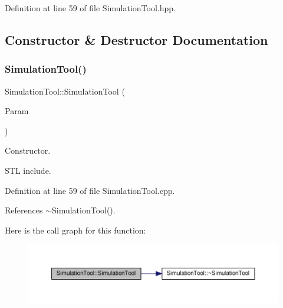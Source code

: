 Definition at line 59 of file Simulation\+Tool.\+hpp.



\subsection{Constructor \& Destructor Documentation}
\mbox{\label{classSimulationTool_ab33ce104c4f79adddbc2b57e3201a799}} 
\subsubsection{\texorpdfstring{Simulation\+Tool()}{SimulationTool()}}
{\footnotesize\ttfamily Simulation\+Tool\+::\+Simulation\+Tool (\begin{DoxyParamCaption}\item[{const \hyperlink{Parameter_8hpp_a37841774a6fcb479b597fdf8955eb4ea}{Parameter\+Const\+Ref} \&}]{Param }\end{DoxyParamCaption})\hspace{0.3cm}{\ttfamily [explicit]}}



Constructor. 

S\+TL include. 

Definition at line 59 of file Simulation\+Tool.\+cpp.



References $\sim$\+Simulation\+Tool().

Here is the call graph for this function\+:
\nopagebreak
\begin{figure}[H]
\begin{center}
\leavevmode
\includegraphics[width=350pt]{d5/dfc/classSimulationTool_ab33ce104c4f79adddbc2b57e3201a799_cgraph}
\end{center}
\end{figure}
\mbox{\label{classSimulationTool_a51b21f23f26db8bfcbe9dc18d992a3ea}} 
